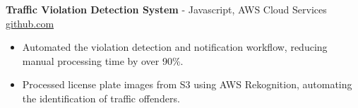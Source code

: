 \documentclass[11pt]{article}       %
\begin{document}

\textbf{Traffic Violation Detection System}{ - Javascript, AWS Cloud Services} \hfill \href{https://github.com/Monica20030707/AWS_rekonigition-N-read-database}{github.com} \\
\vspace{-9pt}
\begin{itemize}
  \item Automated the violation detection and notification workflow, reducing manual processing time by over 90\%.
  \item Processed license plate images from S3 using AWS Rekognition, automating the identification of traffic offenders.
\end{itemize}

\end{document}
